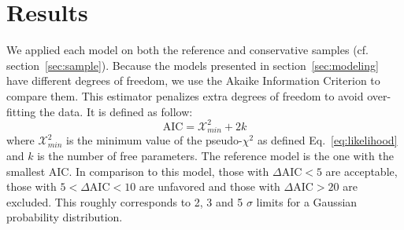 \documentclass[]{aa} %
\begin{document}
\section{Results}\label{sec:results}

We applied each model on both the reference and conservative samples (cf.
section~\ref{sec:sample}). Because the models presented in
section~\ref{sec:modeling} have different degrees of freedom, we use the Akaike
Information Criterion \citep[AIC, e.g.][]{burnham2004} to compare them. This
estimator penalizes extra degrees of freedom to avoid over-fitting the data. It
is defined as follow:
\begin{equation}
    \mathrm{AIC} = \mathcal{X}^2_{min} + 2k
\end{equation}
where $\mathcal{X}^2_{min}$ is the minimum value of the pseudo-$\chi^2$ as
defined Eq.~\eqref{eq:likelihood} and $k$ is the number of free parameters. The
reference model is the one with the smallest AIC. In comparison to this model,
those with $\Delta\mathrm{AIC}<5$ are acceptable, those with
$5<\Delta\mathrm{AIC}<10$ are unfavored and those with $\Delta\mathrm{AIC}>20$
are excluded. This roughly corresponds to 2, 3 and 5 $\sigma$ limits for a
Gaussian probability distribution.
\end{document}
